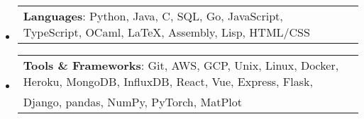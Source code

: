 \documentclass[letterpaper,11pt]{article}
\makeatletter
\newcommand{\resumeSubheading}[4]{
  \vspace{-2pt}\item
    \begin{tabular*}{0.97\textwidth}[t]{l@{\extracolsep{\fill}}r}
      \textbf{#1} & #2 \\
      \textit{\small#3} & \textit{\small #4} \\
    \end{tabular*}\vspace{-8pt}
}
\newcommand{\resumeProjectHeading}[2]{
    \item
    \begin{tabular*}{0.97\textwidth}{l@{\extracolsep{\fill}}r}
      \small#1 & \emph{#2} \\
    \end{tabular*}\vspace{-8pt}
}
\newcommand{\resumeSubHeadingListStart}{\begin{itemize}[leftmargin=0.05in, label={}]}
\newcommand{\resumeSubHeadingListEnd}{\end{itemize}}
\makeatother
\begin{document}
    

\resumeSubHeadingListStart

    \resumeProjectHeading
    {\textbf{Languages}: Python, Java, C, SQL, Go, JavaScript, TypeScript, OCaml, LaTeX, Assembly, Lisp, HTML/CSS}{}
    \resumeProjectHeading
    {\textbf{Tools \& Frameworks}: Git, AWS, GCP, Unix, Linux, Docker, Heroku, MongoDB, InfluxDB, React, Vue, Express, Flask, \\ Django, pandas, NumPy, PyTorch, MatPlot}{}
\resumeSubHeadingListEnd
\end{document}
